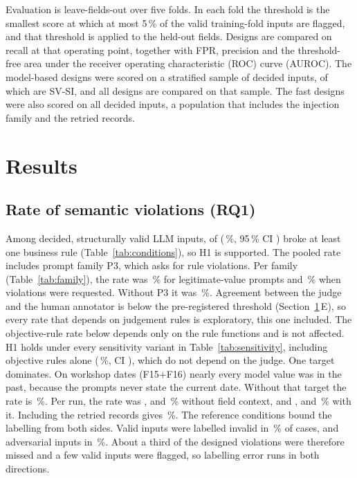 \documentclass[conference]{IEEEtran}
\begin{document}
Evaluation is leave-fields-out over five folds. In each fold the threshold is the smallest score at
which at most 5\,\% of the valid training-fold inputs are flagged, and that threshold is applied to the
held-out fields. Designs are compared on recall at that operating point, together with FPR, precision
and the threshold-free area under the receiver operating characteristic (ROC) curve (AUROC). The
model-based designs were scored on a stratified sample of  decided inputs, of which
 are SV-SI, and all designs are compared on that sample. The fast designs were also scored on
all  decided inputs, a population that includes the injection family and the retried
records.

\section{Results}
\label{sec:results}

\subsection{Rate of semantic violations (RQ1)}

Among decided, structurally valid LLM inputs,  of  (\,\%, 95\,\% CI
) broke at least one business rule (Table~\ref{tab:conditions}), so H1 is supported. The
pooled rate includes prompt family P3, which asks for rule violations. Per family
(Table~\ref{tab:family}), the rate was \,\% for legitimate-value prompts and
\,\% when violations were requested. Without P3 it was \,\%.
\ifjudgeweak Agreement between the judge and the human annotator is below the pre-registered threshold
(Section~\ref{sec:results}\,E), so every rate that depends on judgement rules is exploratory, this one
included. The objective-rule rate below depends only on the rule functions and is not affected.\fi{}
H1 holds under every sensitivity variant in Table~\ref{tab:sensitivity}, including objective rules
alone (\,\%, CI ), which do not depend on the judge. One
target dominates. On workshop dates (F15+F16) nearly every model value was in the past, because the
prompts never state the current date. Without that target the rate is \,\%. Per run,
the rate was ,  and \,\% without field context, and ,
 and \,\% with it. Including the retried records gives \,\%.
The reference conditions bound the labelling from both sides. Valid inputs were labelled invalid in
\,\% of cases, and adversarial inputs in \,\%. About a third of the designed
violations were therefore missed and a few valid inputs were flagged, so labelling error runs in both
directions.
\end{document}
